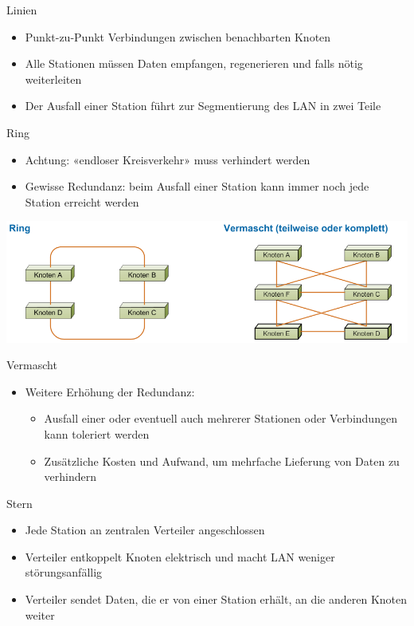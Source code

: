 \begin{definition}{Linien}
    \begin{itemize}
        \item Punkt-zu-Punkt Verbindungen zwischen benachbarten Knoten
        \item Alle Stationen müssen Daten empfangen, regenerieren und falls nötig weiterleiten
        \item Der Ausfall einer Station führt zur Segmentierung des LAN in zwei Teile
    \end{itemize}
\end{definition}

\begin{definition}{Ring}
    \begin{itemize}
        \item Achtung: «endloser Kreisverkehr» muss verhindert werden
        \item Gewisse Redundanz: beim Ausfall einer Station kann immer noch jede Station erreicht werden
    \end{itemize}
\end{definition}

 
    \centering
    \includegraphics[width=0.9\linewidth]{images/ring_vermascht_topo.png}
 

\begin{definition}{Vermascht}
    \begin{itemize}
        \item Weitere Erhöhung der Redundanz:
        \begin{itemize}
            \item Ausfall einer oder eventuell auch mehrerer Stationen oder Verbindungen kann toleriert werden
            \item Zusätzliche Kosten und Aufwand, um mehrfache Lieferung von Daten zu verhindern
        \end{itemize}
    \end{itemize}
\end{definition}

\begin{definition}{Stern}
\begin{itemize}
    \item Jede Station an zentralen Verteiler angeschlossen
    \item Verteiler entkoppelt Knoten elektrisch und macht LAN weniger störungsanfällig
    \item Verteiler sendet Daten, die er von einer Station erhält, an die anderen Knoten weiter
\end{itemize}
\end{definition}


